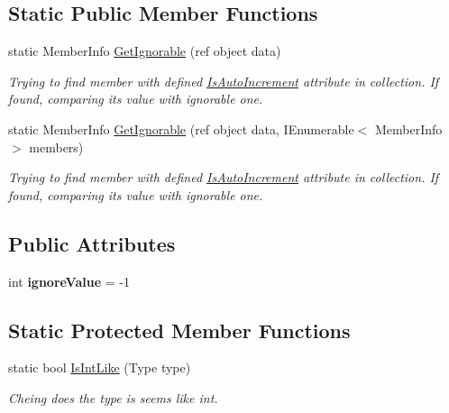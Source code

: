 \subsection*{Static Public Member Functions}
\begin{DoxyCompactItemize}
\item 
static Member\+Info \mbox{\hyperlink{class_uniform_data_operator_1_1_sql_1_1_attributes_1_1_is_auto_increment_ac254039f081903e685e116ec6993f9db}{Get\+Ignorable}} (ref object data)
\begin{DoxyCompactList}\small\item\em Trying to find member with defined \mbox{\hyperlink{class_uniform_data_operator_1_1_sql_1_1_attributes_1_1_is_auto_increment}{Is\+Auto\+Increment}} attribute in collection. If found, comparing it\textquotesingle{}s value with ignorable one. \end{DoxyCompactList}\item 
static Member\+Info \mbox{\hyperlink{class_uniform_data_operator_1_1_sql_1_1_attributes_1_1_is_auto_increment_ac662ab14322c8114855cb22e5395ab56}{Get\+Ignorable}} (ref object data, I\+Enumerable$<$ Member\+Info $>$ members)
\begin{DoxyCompactList}\small\item\em Trying to find member with defined \mbox{\hyperlink{class_uniform_data_operator_1_1_sql_1_1_attributes_1_1_is_auto_increment}{Is\+Auto\+Increment}} attribute in collection. If found, comparing it\textquotesingle{}s value with ignorable one. \end{DoxyCompactList}\end{DoxyCompactItemize}
\subsection*{Public Attributes}
\begin{DoxyCompactItemize}
\item 
\mbox{\label{class_uniform_data_operator_1_1_sql_1_1_attributes_1_1_is_auto_increment_a3d14551782db0a2825335c02058c4735}} 
int {\bfseries ignore\+Value} = -\/1
\end{DoxyCompactItemize}
\subsection*{Static Protected Member Functions}
\begin{DoxyCompactItemize}
\item 
static bool \mbox{\hyperlink{class_uniform_data_operator_1_1_sql_1_1_attributes_1_1_is_auto_increment_acea9a992c39c789aa6ac336d7240a7bc}{Is\+Int\+Like}} (Type type)
\begin{DoxyCompactList}\small\item\em Cheing does the type is seems like int. \end{DoxyCompactList}\end{DoxyCompactItemize}


